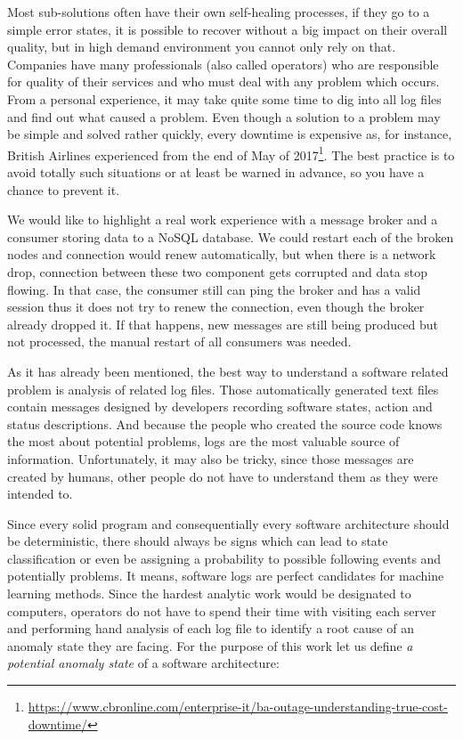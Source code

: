 Most sub-solutions often have their own self-healing processes, if they go to a simple error states, it is possible to recover without a big impact on their overall quality, but in high demand environment\ms{,} you cannot only rely on that. Companies have many professionals (also called operators) who are responsible for quality of their services and who must deal with any problem which occurs. From a personal experience, it may take quite some time to dig into all log files and find out what caused a problem. Even though a solution to a problem may be simple and solved rather quickly, every downtime is expensive as, for instance, British Airlines experienced from the end of May of 2017\footnote{\url{https://www.cbronline.com/enterprise-it/ba-outage-understanding-true-cost-downtime/}}. The best practice is to avoid totally such situations or at least be warned in advance, so you have a chance to prevent it.

We would like to highlight a real work experience with a message broker and a consumer storing data to a NoSQL database. We could restart each of the broken nodes and connection would renew automatically, but when there is a network drop, connection between these two component gets corrupted and data stop flowing. In that case, the consumer still can ping the broker and has a valid session thus it does not try to renew the connection, even though the broker already dropped it. If that happens, new messages are still being produced but not processed, the manual restart of all consumers was needed. 

As it has already been mentioned, the best way to understand a software related problem is analysis of related log files. Those automatically generated text files contain messages designed by developers recording software states, action and status descriptions. And because the people who created the source code knows the most about potential problems, logs are the most valuable source of information. Unfortunately, it may also be tricky, since those messages are created by humans, other people do not have to understand them as they were intended to.

Since every solid program and consequentially every software architecture should be deterministic, there should always be signs which can lead to state classification or even be assigning a probability to possible following events and potentially problems. It means, software logs are perfect candidates for machine learning methods. Since the hardest analytic work would be designated to computers, operators do not have to spend their time with visiting each server and performing hand analysis of each log file to identify a root cause of an anomaly state they are facing.
For the purpose of this work let us define \textit{a potential anomaly state} of a software architecture:

